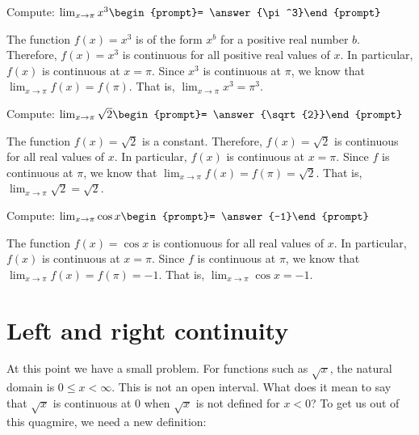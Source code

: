 \documentclass{ximera}
\begin{document}
\begin{question}
  Compute:
  $\lim_{x\to \pi} x^3\begin{prompt}= \answer{\pi^3}\end{prompt}$
  \begin{feedback}
    The function $f(x)=x^3$ is of the form $x^b$ for a positive real number
    $b$.  Therefore, $f(x)=x^3$ is continuous for all positive real values of
    $x$.  In particular, $f(x)$ is continuous at $x=\pi$.  Since $x^3$
    is continuous at $\pi$, we know that $\lim_{x\to \pi} f(x) = f(\pi)$.
    That is, $\lim_{x\to \pi} x^3 = \pi^3$.
  \end{feedback}  
\end{question}
\begin{question}
  Compute:
  $\lim_{x\to \pi} \sqrt{2}\begin{prompt}= \answer{\sqrt{2}}\end{prompt}$
  \begin{feedback}
    The function $f(x)= \sqrt{2}$ is a constant.
  Therefore, $f(x)=\sqrt{2}$ is continuous for all real values of
    $x$.  In particular, $f(x)$ is continuous at $x=\pi$.  Since $f$
    is continuous at $\pi$, we know that $\lim_{x\to \pi} f(x) = f(\pi)=\sqrt{2}$.
    That is, $\lim_{x\to \pi} \sqrt{2}= \sqrt{2}$.
  \end{feedback}  
\end{question}
\begin{question}
  Compute:
  $\lim_{x\to \pi} \cos{x}\begin{prompt}= \answer{-1}\end{prompt}$
  \begin{feedback}
    The function $f(x)=  \cos{x}$ is contionuous
 for all real values of
    $x$.  In particular, $f(x)$ is continuous at $x=\pi$.  Since $f$
    is continuous at $\pi$, we know that $\lim_{x\to \pi} f(x) = f(\pi)=-1$.
    That is, $\lim_{x\to \pi} \cos{x}= -1$.
  \end{feedback}  
\end{question}
\section{Left and right continuity}


At this point we have a small problem.  For functions such as
$\sqrt{x}$, the natural domain is $0\leq x <\infty$.  This is not an
open interval.  What does it mean to say that $\sqrt{x}$ is continuous
at $0$ when $\sqrt{x}$ is not defined for $x<0$? To get us out of this
quagmire, we need a new definition:
\end{document}

